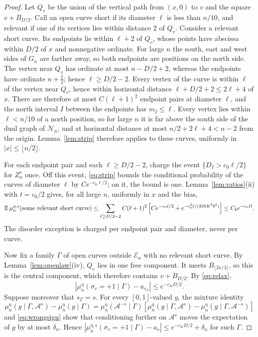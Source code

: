 \begin{proof}
Let $Q_v$ be the union of the vertical path from $(x,0)$ to $v$ and the square $v+B_{D/2}$. Call an open curve short if its diameter $\ell$ is less than $n/10$, and relevant if one of its vertices lies within distance $2$ of $Q_v$. Consider a relevant short curve. Its endpoints lie within $\ell+2$ of $Q_v$, whose points have abscissa within $D/2$ of $x$ and nonnegative ordinate. For large $n$ the south, east and west sides of $G_n$ are farther away, so both endpoints are positions on the north side. The vertex near $Q_v$ has ordinate at most $n-D/2+2$, whereas the endpoints have ordinate $n+\tfrac12$; hence $\ell\ge D/2-2$. Every vertex of the curve is within $\ell$ of the vertex near $Q_v$, hence within horizontal distance $\ell+D/2+2\le2\ell+4$ of $x$. There are therefore at most $C(\ell+1)^2$ endpoint pairs at diameter $\ell$, and the north interval $I$ between the endpoints has $m_I\le\ell$. Every vertex lies within $\ell<n/10$ of a north position, so for large $n$ it is far above the south side of the dual graph of $\mathcal N_n$, and at horizontal distance at most $n/2+2\ell+4<n-2$ from the origin. Lemma~\ref{lem:strip} therefore applies to these curves, uniformly in $|x|\le\lfloor n/2\rfloor$.

For each endpoint pair and each $\ell\ge D/2-2$, charge the event $\{D_I>c_0\ell/2\}$ for $Z_n^s$ once. Off this event, \eqref{eq:strip} bounds the conditional probability of the curves of diameter $\ell$ by $Ce^{-c_0\ell/2}$; on it, the bound is one. Lemma~\ref{lem:ratios}(ii) with $t=c_0/2$ gives, for all large $n$, uniformly in $x$ and the bias,
\begin{equation}\label{eq:shortarcs}
 \mathbb E\,\mu_n^{\eta,s}(\text{some relevant short curve})
 \le\sum_{\ell\ge D/2-2}C(\ell+1)^2\left[Ce^{-c_0\ell/2}+e^{-c_0^2\ell/(256K^2b^2)}\right]
 \le C_be^{-c_bD}.
\end{equation}
The disorder exception is charged per endpoint pair and diameter, never per curve.

Now fix a family $\Gamma$ of open curves outside $\mathcal E_n$ with no relevant short curve. By Lemma~\ref{lem:openlaw}(iv), $Q_v$ lies in one free component. It meets $B_{\lfloor2n/3\rfloor}$, so this is the central component, which therefore contains $v+B_{D/2}$. By \eqref{eq:relax},
\[
 |\mu_n^\eta(\sigma_v=+1\mid\Gamma)-a_{s_\Gamma}|\le e^{-c_KD/2}.
\]
Suppose moreover that $s_\Gamma=s$. For every $[0,1]$-valued $g$, the mixture identity
\[
 \mu_n^\eta(g\mid\Gamma,\mathcal A^s)-\mu_n^\eta(g\mid\Gamma)
 =\mu_n^\eta(\mathcal A^{-s}\mid\Gamma)\left[\mu_n^\eta(g\mid\Gamma,\mathcal A^s)-\mu_n^\eta(g\mid\Gamma,\mathcal A^{-s})\right]
\]
and \eqref{eq:wrongsign} show that conditioning further on $\mathcal A^s$ moves the expectation of $g$ by at most $\delta_n$. Hence $|\mu_n^{\eta,s}(\sigma_v=+1\mid\Gamma)-a_s|\le e^{-c_KD/2}+\delta_n$ for such $\Gamma$.


\end{proof}
